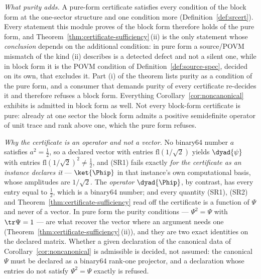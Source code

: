 
\begin{remark}\label{rem:certificate-forms}
\emph{What purity adds.} A pure-form certificate satisfies every condition of
the block form at the one-sector structure and one condition more
(Definition~\ref{def:srcert}). Every statement this module proves of the
block form therefore holds of the pure form, and
Theorem~\ref{thm:certificate-sufficiency}\,(ii) is the only statement whose \emph{conclusion}
depends on the additional condition: in pure form a source/POVM mismatch of
the kind (ii) describes is a detected defect and not a silent one, while in
block form it is the POVM condition of Definition~\ref{def:source-spec},
decided on its own, that excludes it. Part (i) of the theorem lists purity as
a condition of the pure form, and a consumer that demands purity of every
certificate re-decides it and therefore refuses a block form. Everything
Corollary~\ref{cor:noncanonical} exhibits is admitted in block form as well.
Not every block-form certificate is pure: already at one sector the block
form admits a positive semidefinite operator of unit trace and rank above
one, which the pure form refuses.

\emph{Why the certificate is an operator and not a vector.} No binary64
number $a$ satisfies $a^2=\tfrac12$, so a declared vector with entries
$\mathrm{fl}(1/\sqrt2)$ yields $\dyad{\psi}$ with entries
$\mathrm{fl}(1/\sqrt2)^2\ne\tfrac12$, and (SR1) fails exactly \emph{for the
certificate as an instance declares it} --- $\ket{\Phip}$ in that
instance's own computational basis, whose amplitudes are $1/\sqrt2$. The
\emph{operator} $\dyad{\Phip}$, by contrast, has every entry equal to
$\tfrac12$, which is a binary64 number; and every quantity (SR1), (SR2)
and Theorem~\ref{thm:certificate-sufficiency} read off the certificate is a function of
$\Psi$ and never of a vector. In pure form the purity conditions ---
$\Psi^2=\Psi$ with $\tr\Psi=1$ --- are what recover the vector where an
argument needs one (Theorem~\ref{thm:certificate-sufficiency}\,(ii)), and they are two exact
identities on the declared matrix. Whether a given declaration of the
canonical data of Corollary~\ref{cor:noncanonical} is admissible is decided,
not assumed: the canonical $\Psi$ must be declared as a binary64 rank-one
projector, and a declaration whose entries do not satisfy $\Psi^2=\Psi$
exactly is refused.


\end{remark}
